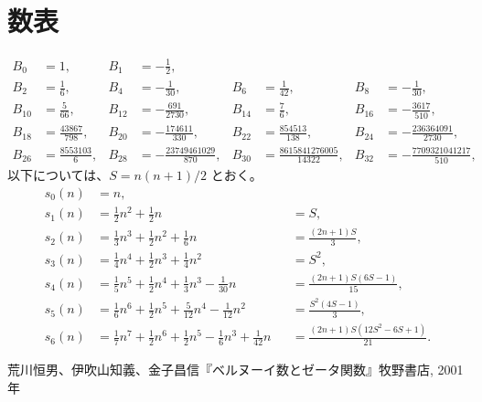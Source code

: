 {\section{数表}
\begin{align*}
  B_0&=1, &
  B_1&=-\frac12, \\
  B_2&=\frac16, &
  B_4&=-\frac{1}{30}, &
  B_6&=\frac{1}{42}, &
  B_8&=-\frac{1}{30}, \\
  B_{10}&=\frac{5}{66}, &
  B_{12}&=-\frac{691}{2730}, &
  B_{14}&=\frac{7}{6}, &
  B_{16}&=-\frac{3617}{510}, \\
  B_{18}&=\frac{43867}{798}, &
  B_{20}&=-\frac{174611}{330}, &
  B_{22}&=\frac{854513}{138}, &
  B_{24}&=-\frac{236364091}{2730}, \\
  B_{26}&=\frac{8553103}{6}, &
  B_{28}&=-\frac{23749461029}{870}, &
  B_{30}&=\frac{8615841276005}{14322}, &
  B_{32}&=-\frac{7709321041217}{510},
\end{align*}
以下については、$S=n(n+1)/2$ とおく。
\begin{align*}
  s_0(n)&=n, \\
  s_1(n)&=\frac12 n^2+\frac12 n &
       &=S, \\
  s_2(n)&=\frac13 n^3+\frac12 n^2+\frac16 n &
        &=\frac{(2n+1)S}{3}, \\
  s_3(n)&=\frac14 n^4+\frac12 n^3+\frac14 n^2 &
        &=S^2, \\
  s_4(n)&=\frac15 n^5+\frac12 n^4+\frac13 n^3-\frac{1}{30} n &
                                &=\frac{(2n+1)S(6S-1)}{15}, \\
  s_5(n)&=\frac16 n^6+\frac12 n^5+\frac{5}{12} n^4-\frac{1}{12} n^2 &
                                &=\frac{S^2(4S-1)}{3}, \\
  s_6(n)&=\frac17 n^7+\frac12 n^6+\frac12 n^5-\frac16 n^3+\frac{1}{42}n &
                                &=\frac{(2n+1)S(12S^2-6S+1)}{21}.
\end{align*}

\begin{thebibliography}{9}
  荒川恒男、伊吹山知義、金子昌信『ベルヌーイ数とゼータ関数』牧野書店, 2001年
\end{thebibliography}
}
